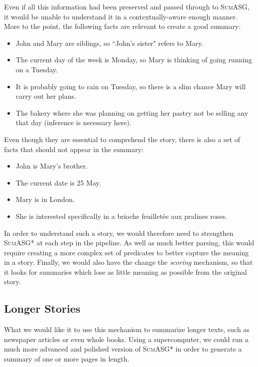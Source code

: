 Even if all this information had been preserved and passed through to \textsc{SumASG}, it would be unable to understand it in a contextually-aware enough manner. More to the point, the following facts are relevant to create a good summary:

\begin{itemize}
\item John and Mary are siblings, so ``John's sister" refers to Mary.
\item The current day of the week is Monday, so Mary is thinking of going running on a Tuesday.
\item It is probably going to rain on Tuesday, so there is a slim chance Mary will carry out her plans.
\item The bakery where she was planning on getting her pastry not be selling any that day (inference is necessary here).
\end{itemize}

Even though they are essential to comprehend the story, there is also a set of facts that should not appear in the summary:

\begin{itemize}
\item John is Mary's brother.
\item The current date is 25 May.
\item Mary is in London.
\item She is interested specifically in a brioche feuilletée aux pralines roses.
\end{itemize}

In order to understand such a story, we would therefore need to strengthen \textsc{SumASG*} at each step in the pipeline. As well as much better parsing, this would require creating a more complex set of predicates to better capture the meaning in a story. Finally, we would also have the change the \textit{scoring} mechanism, so that it looks for summaries which lose as little meaning as possible from the original story.

\subsection{Longer Stories}

What we would like it to use this mechanism to summarize longer texts, such as newspaper articles or even whole books. Using a supercomputer, we could run a much more advanced and polished version of \textsc{SumASG*} in order to generate a summary of one or more pages in length.

